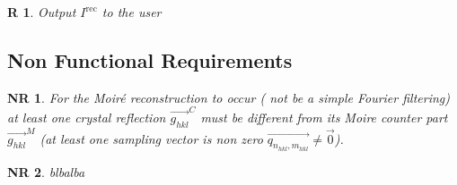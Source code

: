 \documentclass[12pt]{article}
\newtheorem{R}{R}
\newtheorem{NR}{NR}
\begin{document}
\begin{R}
\label{R_output_rec}
\normalfont Output $I^{\text{rec}}$ to the user
\end{R}

\subsection{Non Functional Requirements}

\begin{NR}
\label{NR_1}
\normalfont For the Moir{\'e} reconstruction to occur ( not be a simple Fourier filtering) at least one crystal reflection $\overrightarrow{g_{hkl}}^{C}$ must be different from its Moire counter part $\overrightarrow{g_{hkl}}^{M}$ (at least one sampling vector is non zero $\overrightarrow{q_{n_{hkl},m_{hkl}}} \neq \overrightarrow{0}$).
\end{NR}

\begin{NR}
\label{NR_2}
blbalba
\end{NR}
\end{document}
